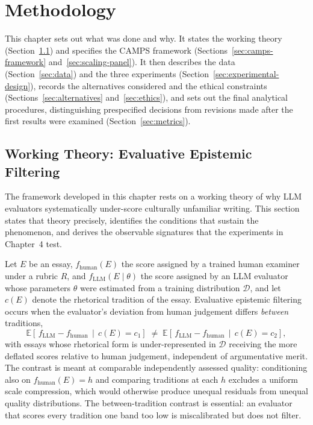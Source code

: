 \chapter{Methodology}
\label{chap:methodology}

This chapter sets out what was done and why. It states the working
theory (Section~\ref{sec:working-theory}) and specifies the CAMPS
framework (Sections~\ref{sec:camps-framework}
and~\ref{sec:scaling-panel}). It then describes the data
(Section~\ref{sec:data}) and the three experiments
(Section~\ref{sec:experimental-design}), records the alternatives
considered and the ethical constraints (Sections~\ref{sec:alternatives}
and~\ref{sec:ethics}), and sets out the final analytical
procedures, distinguishing prespecified decisions from revisions
made after the first results were examined
(Section~\ref{sec:metrics}).

\section{Working Theory: Evaluative Epistemic Filtering}
\label{sec:working-theory}

The framework developed in this chapter rests on a working theory of
why LLM evaluators systematically under-score culturally unfamiliar
writing. This section states that theory precisely, identifies the
conditions that sustain the phenomenon, and derives the observable
signatures that the experiments in Chapter~4 test.

\begin{definition}
\label{def:eef}
Let $E$ be an essay, $f_{\mathrm{human}}(E)$ the score assigned by a
trained human examiner under a rubric $R$, and
$f_{\mathrm{LLM}}(E \mid \theta)$ the score assigned by an LLM
evaluator whose parameters $\theta$ were estimated from a training
distribution $\mathcal{D}$, and let $c(E)$ denote the rhetorical
tradition of the essay. Evaluative epistemic filtering occurs when the
evaluator's deviation from human judgement differs \emph{between}
traditions,
\begin{equation}
\label{eq:eef}
\mathbb{E}\!\left[\, f_{\mathrm{LLM}} - f_{\mathrm{human}} \,\middle|\,
  c(E) = c_1 \right]
\;\neq\;
\mathbb{E}\!\left[\, f_{\mathrm{LLM}} - f_{\mathrm{human}} \,\middle|\,
  c(E) = c_2 \right],
\end{equation}
with essays whose rhetorical form is under-represented in
$\mathcal{D}$ receiving the more deflated scores relative to human
judgement, independent of argumentative merit. The contrast is meant
at comparable independently assessed quality: conditioning also on
$f_{\mathrm{human}}(E) = h$ and comparing traditions at each $h$
excludes a uniform scale compression, which would otherwise produce
unequal residuals from unequal quality distributions. The
between-tradition contrast is essential: an evaluator that scores
every tradition one band too low is miscalibrated but does not
filter.
\end{definition}

